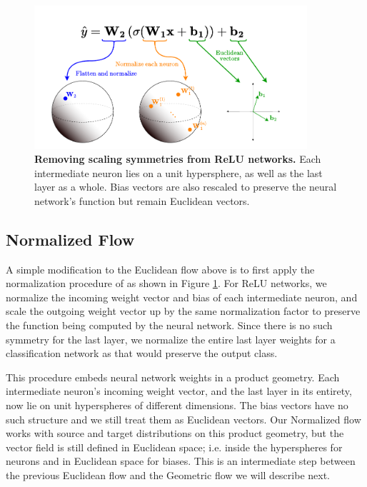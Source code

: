 \begin{figure}[t!]
    \centering
    \includegraphics[width=0.9\textwidth]{figures/canonicalization.drawio.pdf}
    \caption{\label{fig:canonicalization}\textbf{Removing scaling symmetries from ReLU networks.} Each intermediate neuron lies on a unit hypersphere, as well as the last layer as a whole. Bias vectors are also rescaled to preserve the neural network's function but remain Euclidean vectors.}
\end{figure}

\subsection{Normalized Flow}

A simple modification to the Euclidean flow above is to first apply the normalization procedure of \citep{pittorinoDeepNetworksToroids2022} as shown in Figure \ref{fig:canonicalization}. For ReLU networks, we normalize the incoming weight vector and bias of each intermediate neuron, and scale the outgoing weight vector up by the same normalization factor to preserve the function being computed by the neural network. Since there is no such symmetry for the last layer, we normalize the entire last layer weights for a classification network as that would preserve the output class. 

This procedure embeds neural network weights in a product geometry. Each intermediate neuron's incoming weight vector, and the last layer in its entirety, now lie on unit hyperspheres of different dimensions. The bias vectors have no such structure and we still treat them as Euclidean vectors. Our Normalized flow works with source and target distributions on this product geometry, but the vector field is still defined in Euclidean space; i.e. inside the hyperspheres for neurons and in Euclidean space for biases. This is an intermediate step between the previous Euclidean flow and the Geometric flow we will describe next.  


